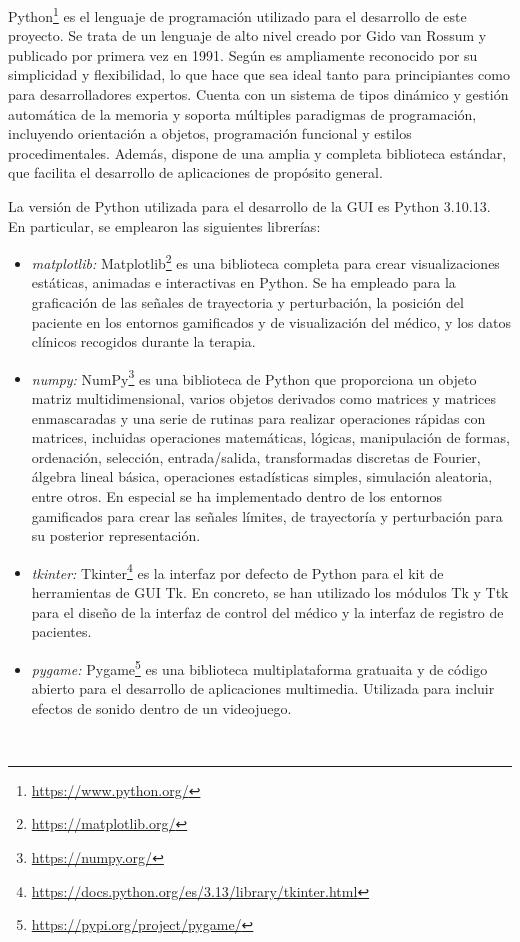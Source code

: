 Python\footnote{\url{https://www.python.org/}} es el lenguaje de programación utilizado para el desarrollo de este proyecto.
Se trata de un lenguaje de alto nivel creado por Gido van Rossum y publicado por primera vez en 1991.
Según \cite{perales9b} es ampliamente reconocido por su simplicidad y flexibilidad, lo que hace que sea ideal tanto para principiantes como para desarrolladores expertos. Cuenta con un sistema de tipos dinámico y gestión automática de la memoria y soporta múltiples paradigmas de programación, incluyendo orientación a objetos, programación funcional y estilos procedimentales. Además, dispone de una amplia y completa biblioteca estándar, que facilita el desarrollo de aplicaciones de propósito general.

La versión de Python utilizada para el desarrollo de la GUI es Python 3.10.13. En particular, se emplearon las siguientes librerías:

\begin{itemize}
    \item \textit{matplotlib:} Matplotlib\footnote{\url{https://matplotlib.org/}} es una biblioteca completa para crear visualizaciones estáticas, animadas e interactivas en Python. Se ha empleado para la graficación de las señales de trayectoria y perturbación, la posición del paciente en los entornos gamificados y de visualización del médico, y los datos clínicos recogidos durante la terapia.
    \item \textit{numpy:} NumPy\footnote{\url{https://numpy.org/}} es una biblioteca de Python que proporciona un objeto matriz multidimensional, varios objetos derivados como matrices y matrices enmascaradas y una serie de rutinas para realizar operaciones rápidas con matrices, incluidas operaciones matemáticas, lógicas, manipulación de formas, ordenación, selección, entrada/salida, transformadas discretas de Fourier, álgebra lineal básica, operaciones estadísticas simples, simulación aleatoria, entre otros. En especial se ha implementado dentro de los entornos gamificados para crear las señales límites, de trayectoría y perturbación para su posterior representación.
    \item \textit{tkinter:} Tkinter\footnote{\url{https://docs.python.org/es/3.13/library/tkinter.html}} es la interfaz por defecto de Python para el kit de herramientas de GUI Tk. En concreto, se han utilizado los módulos Tk y Ttk para el diseño de la interfaz de control del médico y la interfaz de registro de pacientes.
	\item \textit{pygame:} Pygame\footnote{\url{https://pypi.org/project/pygame/}} es una biblioteca multiplataforma gratuaita y de código abierto para el desarrollo de aplicaciones multimedia. Utilizada para incluir efectos de sonido dentro de un videojuego.
\end{itemize}\

